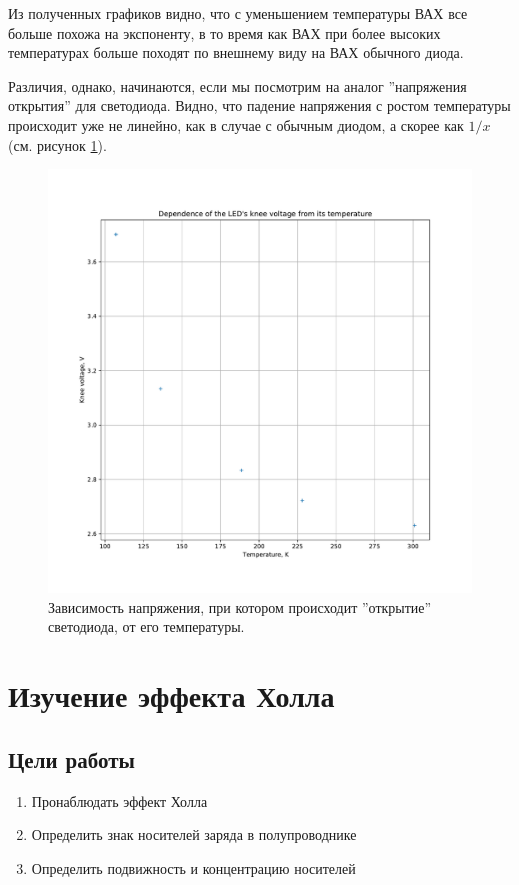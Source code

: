 \documentclass[a4paper, 12pt]{article}
\begin{document}
Из полученных графиков видно, что с уменьшением температуры ВАХ все больше похожа на экспоненту, в то время как ВАХ при более высоких температурах больше походят по внешнему виду на ВАХ обычного диода.

Различия, однако, начинаются, если мы посмотрим на аналог ''напряжения открытия'' для светодиода. Видно, что падение напряжения с ростом температуры происходит уже не линейно, как в случае с обычным диодом, а скорее как $1/x$ (см. рисунок \ref{fig:2_Knee_LED}).

\begin{figure}[H]
	\centering
	\includegraphics[width=\linewidth]{2_Knee_LED}
	\caption{Зависимость напряжения, при котором происходит ''открытие'' светодиода, от его температуры.}
	\label{fig:2_Knee_LED}
\end{figure}


\section{Изучение эффекта Холла}

\subsection{Цели работы}

\begin{enumerate}
	\item Пронаблюдать эффект Холла 
	
	\item Определить знак носителей заряда в полупроводнике 
	
	\item Определить подвижность и концентрацию носителей
	
	
\end{enumerate}
\end{document}
